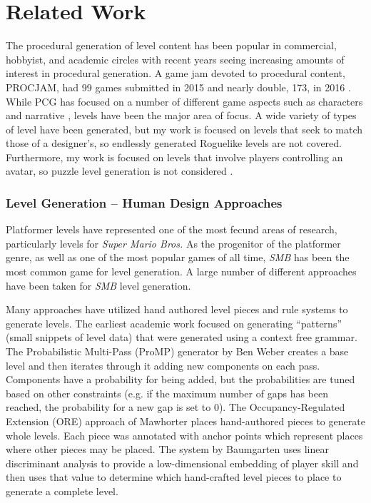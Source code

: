 \documentclass[12pt]{report}
\begin{document}
\section*{Related Work}

The procedural generation of level content has been popular in commercial, hobbyist, and academic circles with recent years seeing increasing amounts of interest in procedural generation.   A game jam devoted to procedural content, PROCJAM, had 99 games submitted in 2015 and nearly double, 173, in 2016 \cite{PROCJAM2015,PROCJAM2016}.  While PCG has focused on a number of different game aspects such as characters \cite{characters} and narrative \cite{riedl2010narrative,li2013story}, levels have been the major area of focus.    A wide variety of types of level have been generated, but my work is focused on levels that seek to match those of a designer's, so endlessly generated Roguelike levels \cite{rogue,adom,nethack} are not covered.  Furthermore, my work is focused on levels that involve players controlling an avatar, so puzzle level generation is not considered \cite{smith2012case,shaker2013ropossum,stephenson2016procedural}.

\subsubsection*{Level Generation -- Human Design Approaches}
Platformer levels have represented one of the most fecund areas of research, particularly levels for \textit{Super Mario Bros.}  As the progenitor of the platformer genre, as well as one of the most popular games of all time, \textit{SMB} has been the most common game for level generation.  A large number of different approaches have been taken for \textit{SMB} level generation.

Many approaches have utilized hand authored level pieces and rule systems to generate levels. The earliest academic work\cite{compton2006procedural} focused on generating ``patterns'' (small snippets of level data) that were generated using a context free grammar. The Probabilistic Multi-Pass (ProMP) generator by Ben Weber \cite{mario2010} creates a base level and then iterates through it adding new components on each pass.  Components have a probability for being added, but the probabilities are tuned based on other constraints (e.g. if the maximum number of gaps has been reached, the probability for a new gap is set to 0).  The Occupancy-Regulated Extension (ORE) approach of Mawhorter \cite{mawhorter2010procedural} places hand-authored pieces to generate whole levels.  Each piece was annotated with anchor points which represent places where other pieces may be placed.   The system by Baumgarten \cite{mario2010} uses linear discriminant analysis to provide a low-dimensional embedding of player skill and then uses that value to determine which hand-crafted level pieces to place to generate a complete level. 
\end{document}
